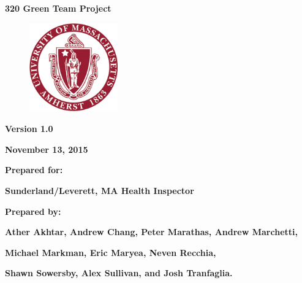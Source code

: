 \documentclass[twoside,letterpaper]{article}
\begin{document}
\clearpage\setcounter{page}{1}\pagestyle{Standard}
\thispagestyle{FirstPage}


\bigskip

{\centering{}\bfseries\color{black}
320 Green Team Project
\par}


\bigskip


\begin{figure}
\centering
\includegraphics[width=1.5in,height=1.5in]{Uma_seal.png}
\end{figure}

\bigskip


\bigskip

{\centering{}\bfseries\color{black}
Version 1.0
\par}

{\centering{}\bfseries\color{black}
November 13, 2015
\par}


\bigskip


\bigskip

{\centering{}\bfseries\color{black}
Prepared for:
\par}

{\centering{}\bfseries\color{black}
Sunderland/Leverett, MA Health Inspector
\par}


\bigskip


\bigskip

{\centering{}\bfseries\color{black}
Prepared by:
\par}

{\centering{}\bfseries\color{black}
Ather Akhtar, Andrew Chang, Peter Marathas, Andrew Marchetti, \par} 
{\centering{}\bfseries\color{black}
 Michael Markman, Eric Maryea, Neven Recchia,
\par}
{\centering{}\bfseries\color{black}
Shawn Sowersby, Alex Sullivan, and Josh Tranfaglia.\par}
\end{document}
